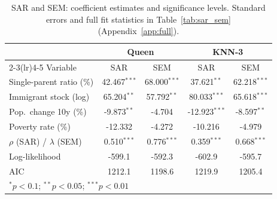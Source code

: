 \begin{table}[ht]
\centering
\caption{SAR and SEM: coefficient estimates and significance levels. Standard errors and full fit statistics in Table~\ref{tab:sar_sem} (Appendix~\ref{app:full}).}
\label{tab:sar_sem_compact}
\begin{tabular}{lcccc}
  \toprule
  & \multicolumn{2}{c}{\textbf{Queen}} & \multicolumn{2}{c}{\textbf{KNN-3}} \\
  \cmidrule(lr){2-3}\cmidrule(lr){4-5}
  Variable & SAR & SEM & SAR & SEM \\
  \midrule
  Single-parent ratio (\%) & 42.467$^{***}$ & 68.000$^{***}$ & 37.621$^{**}$ & 62.218$^{***}$ \\
  Immigrant stock (log) & 65.204$^{**}$ & 57.792$^{**}$ & 80.033$^{***}$ & 65.618$^{***}$ \\
  Pop.~change 10y (\%) & -9.873$^{**}$ & -4.704 & -12.923$^{***}$ & -8.597$^{**}$ \\
  Poverty rate (\%) & -12.332 & -4.272 & -10.216 & -4.979 \\
  \midrule
  $\rho$ (SAR) / $\lambda$ (SEM) & 0.510$^{***}$ & 0.776$^{***}$ & 0.359$^{***}$ & 0.668$^{***}$ \\
  Log-likelihood & -599.1 & -592.3 & -602.9 & -595.7 \\
  AIC & 1212.1 & 1198.6 & 1219.9 & 1205.4 \\
  \bottomrule
  \multicolumn{5}{l}{\scriptsize $^{*}p<0.1$;\; $^{**}p<0.05$;\; $^{***}p<0.01$} \\
\end{tabular}
\end{table}
